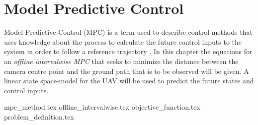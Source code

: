 \chapter{Model Predictive Control}
\label{ch:optimization}

Model Predictive Control (MPC) is a term used to describe control methods that uses knowledge about the process to calculate the future control inputs to the system in order to follow a reference trajectory \cite{mpcCAMACHO}. In this chapter the equations for an \textit{offline intervalwise MPC} that seeks to minimize the distance between the camera centre point and the ground path that is to be observed will be given. A linear state space-model for the UAV will be used to predict the future states and control inputs.


{mpc_method.tex}
{offline_intervalwise.tex}
{objective_function.tex}
{problem_definition.tex}